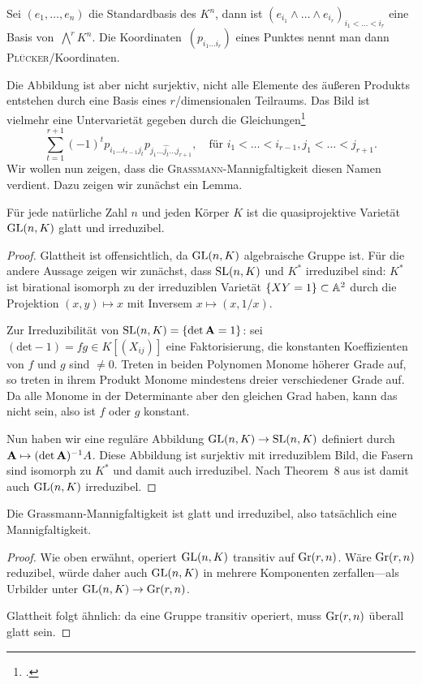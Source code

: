 Sei $(e_1, \dots, e_n)$ die Standardbasis des $K^n$, dann ist $(e_{i_1} \wedge \dots \wedge e_{i_r})_{i_1 < \dots < i_r}$ eine Basis von~$\bigwedge^r K^n$. Die Koordinaten~$(p_{i_1 \dots i_r})$ eines Punktes nennt man dann \textsc{Plücker}\-/Koordinaten.

Die Abbildung ist aber nicht surjektiv, nicht alle Elemente des äußeren Produkts entstehen durch eine Basis eines $r$\-/dimensionalen Teilraums. Das Bild ist vielmehr eine Untervarietät gegeben durch die Gleichungen\footcite[siehe][S.~42]{Shafarevich}
\begin{equation} \label{eq:grcond}
\sum_{t=1}^{r+1} (-1)^t p_{i_1 \dots i_{r-1} j_t} p_{j_1 \dots \hat{j_t} \dots j_{r+1}}, \quad\text{für } i_1 < \dots < i_{r-1}, j_1 < \dots < j_{r+1}.
\end{equation}
Wir wollen nun zeigen, dass die \textsc{Grassmann}-Mannigfaltigkeit diesen Namen verdient. Dazu zeigen wir zunächst ein Lemma.

\begin{lemma}
Für jede natürliche Zahl $n$ und jeden Körper $K$ ist die quasiprojektive Varietät~$\mathrm{GL}(n,K)$ glatt und irreduzibel.
\end{lemma}
\begin{proof}
Glattheit ist offensichtlich, da $\mathrm{GL}(n,K)$ algebraische Gruppe ist. Für die andere Aussage zeigen wir zunächst, dass $\mathrm{SL}(n,K)$ und $K^*$ irreduzibel sind: $K^*$ ist birational isomorph zu der irreduziblen Varietät $\{ XY = 1 \} \subset \mathbb A^{2}$ durch die Projektion $(x,y) \mapsto x$ mit Inversem $x \mapsto (x,1/x)$.

Zur Irreduzibilität von $\mathrm{SL}(n,K) = \{\det \mathbf{A} = 1\}$: sei $(\mathrm{det}-1)=fg \in K[(X_{ij})]$ eine Faktorisierung, die konstanten Koeffizienten von $f$ und $g$ sind $\neq 0$. Treten in beiden Polynomen Monome höherer Grade auf, so treten in ihrem Produkt Monome mindestens dreier verschiedener Grade auf. Da alle Monome in der Determinante aber den gleichen Grad haben, kann das nicht sein, also ist $f$ oder $g$ konstant.

Nun haben wir eine reguläre Abbildung $\mathrm{GL}(n,K) \rightarrow \mathrm{SL}(n,K)$ definiert durch $\mathbf{A} \mapsto \mathbf{(}\!\det \mathbf{A})^{-1} A$. Diese Abbildung ist surjektiv mit irreduziblem Bild, die Fasern sind isomorph zu $K^*$ und damit auch irreduzibel. Nach Theorem~8 aus \cite[S.~77]{Shafarevich} ist damit auch $\mathrm{GL}(n,K)$ irreduzibel.
\end{proof}

\begin{fact}
Die Grassmann-Mannigfaltigkeit ist glatt und irreduzibel, also tatsächlich eine Mannigfaltigkeit.
\end{fact}
\begin{proof}
Wie oben erwähnt, operiert $\mathrm{GL}(n,K)$ transitiv auf $\grass r/n$. Wäre $\grass r/n$ reduzibel, würde daher auch $\mathrm{GL}(n,K)$ in mehrere Komponenten zerfallen---als Urbilder unter $\GL nK \to \grass r/n$.

Glattheit folgt ähnlich: da eine Gruppe transitiv operiert, muss $\grass r/n$ überall glatt sein.
\end{proof}

